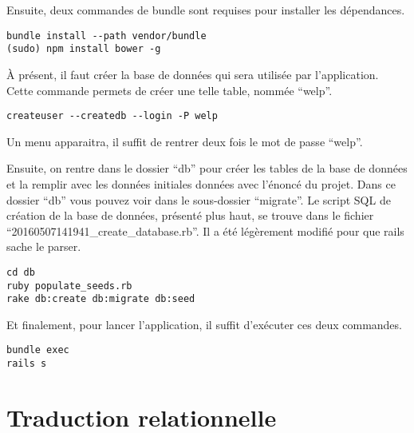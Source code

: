 \documentclass[a4paper,10pt]{article}
\begin{document}
Ensuite, deux commandes de bundle sont requises pour installer les dépendances.

\begin{verbatim}
bundle install --path vendor/bundle
(sudo) npm install bower -g
\end{verbatim}

À présent, il faut créer la base de données qui sera utilisée par l'application. Cette commande permets de créer une telle table, nommée ``welp''.

\begin{verbatim}
createuser --createdb --login -P welp
\end{verbatim}

Un menu apparaitra, il suffit de rentrer deux fois le mot de passe ``welp''.

Ensuite, on rentre dans le dossier ``db'' pour créer les tables de la base de données et la remplir avec les données initiales données avec l'énoncé du projet. Dans ce dossier ``db'' vous pouvez voir dans le sous-dossier ``migrate''. Le script SQL de création de la base de données, présenté plus haut, se trouve dans le fichier ``20160507141941\_create\_database.rb''. Il a été légèrement modifié pour que rails sache le parser.

\begin{verbatim}
cd db
ruby populate_seeds.rb
rake db:create db:migrate db:seed
\end{verbatim}

Et finalement, pour lancer l'application, il suffit d'exécuter ces deux commandes.

\begin{verbatim}
bundle exec
rails s
\end{verbatim}

\begin{landscape}



\end{landscape}

\section{Traduction relationnelle}
\end{document}
